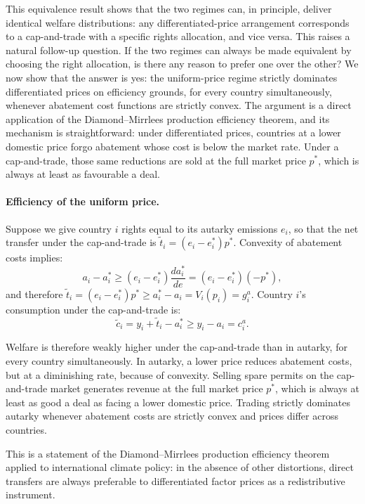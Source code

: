 \documentclass[12pt,english]{article}
\begin{document}
This equivalence result shows that the two regimes can, in principle, deliver identical welfare distributions: any differentiated-price arrangement corresponds to a cap-and-trade with a specific rights allocation, and vice versa. This raises a natural follow-up question. If the two regimes can always be made equivalent by choosing the right allocation, is there any reason to prefer one over the other? We now show that the answer is yes: the uniform-price regime strictly dominates differentiated prices on efficiency grounds, for every country simultaneously, whenever abatement cost functions are strictly convex. The argument is a direct application of the Diamond--Mirrlees production efficiency theorem, and its mechanism is straightforward: under differentiated prices, countries at a lower domestic price forgo abatement whose cost is below the market rate. Under a cap-and-trade, those same reductions are sold at the full market price $p^*$, which is always at least as favourable a deal.

\paragraph{Efficiency of the uniform price.} Suppose we give country $i$ rights equal to its autarky emissions $e_i$, so that the net transfer under the cap-and-trade is $\tilde{t}_i = (e_i -e^*_i)p^*$. Convexity of abatement costs implies:
\begin{equation}
    a_i - a^*_i \geq (e_i - e^*_i)\frac{da^*_i}{de} = (e_i - e^*_i)(-p^*),
\end{equation}
and therefore $\tilde{t}_i = (e_i - e^*_i)p^* \geq a^*_i - a_i = V_i(p_i) =g^a_i$. Country $i$'s consumption under the cap-and-trade is:
\begin{equation}
    \tilde{c}_i = y_i + \tilde{t}_i - a^*_i \geq y_i - a_i = c^a_i.
\end{equation}

Welfare is therefore weakly higher under the cap-and-trade than in autarky, for every country simultaneously. In autarky, a lower price reduces abatement costs, but at a diminishing rate, because of convexity. Selling spare permits on the cap-and-trade market generates revenue at the full market price $p^*$, which is always at least as good a deal as facing a lower domestic price. Trading strictly dominates autarky whenever abatement costs are strictly convex and prices differ across countries.

This is a statement of the Diamond--Mirrlees production efficiency theorem~\cite{diamond1971optimal} applied to international climate policy: in the absence of other distortions, direct transfers are always preferable to differentiated factor prices as a redistributive instrument.
\end{document}
